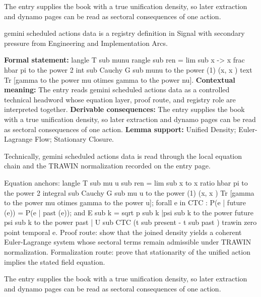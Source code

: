 The entry supplies the book with a true unification density, so later extraction and dynamo pages can be read as sectoral consequences of one action.
\clearpage


\begingroup\small
{}
gemini scheduled actions data is a registry definition in Signal with secondary pressure from Engineering and Implementation Arcs.

\begingroup\footnotesize\setlength{\emergencystretch}{3em}\sloppy
\textbf{Formal statement:} langle T sub munu rangle sub ren = lim sub x -> x frac hbar pi to the power 2 int sub Cauchy G sub munu to the power (1) (x, x ) text Tr [gamma to the power mu otimes gamma to the power nu]. \textbf{Contextual meaning:} The entry reads gemini scheduled actions data as a controlled technical headword whose equation layer, proof route, and registry role are interpreted together. \textbf{Derivable consequences:} The entry supplies the book with a true unification density, so later extraction and dynamo pages can be read as sectoral consequences of one action. \textbf{Lemma support:} Unified Density; Euler-Lagrange Flow; Stationary Closure.\par
\endgroup

Technically, gemini scheduled actions data is read through the local equation chain and the TRAWIN normalization recorded on the entry page.

Equation anchors: langle T sub mu u sub ren = lim sub x to x ratio hbar pi to the power 2 integral sub Cauchy G sub mu u to the power (1) (x, x ) Tr [gamma to the power mu otimes gamma to the power u]; forall e in CTC : P(e | future (e)) = P(e | past (e)); and E sub k = sqrt p sub k |psi sub k to the power future psi sub k to the power past | U sub CTC (t sub present - t sub past ) trawin zero point temporal e. Proof route: show that the joined density yields a coherent Euler-Lagrange system whose sectoral terms remain admissible under TRAWIN normalization. Formalization route: prove that stationarity of the unified action implies the stated field equation.

The entry supplies the book with a true unification density, so later extraction and dynamo pages can be read as sectoral consequences of one action.
\endgroup

